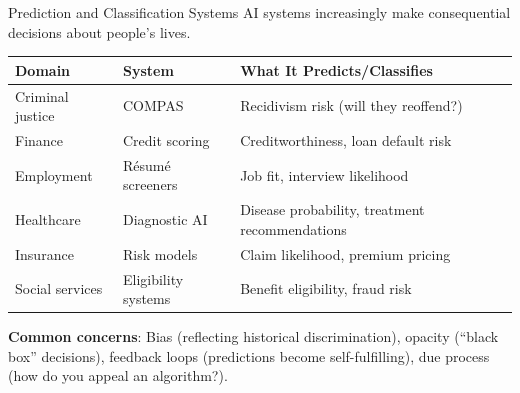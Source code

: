 ﻿\documentclass[aspectratio=169,11pt]{beamer}
\begin{document}
\begin{frame}{Prediction and Classification Systems}
AI systems increasingly make consequential decisions about people's lives.

\vspace{0.2em}
\begin{table}[h]
\centering
\scriptsize
\begin{tabular}{@{}p{2.3cm}p{3cm}p{6.5cm}@{}}
\toprule
\textbf{Domain} & \textbf{System} & \textbf{What It Predicts/Classifies} \\
\midrule
Criminal justice & COMPAS & Recidivism risk (will they reoffend?) \\
Finance & Credit scoring & Creditworthiness, loan default risk \\
Employment & Résumé screeners & Job fit, interview likelihood \\
Healthcare & Diagnostic AI & Disease probability, treatment recommendations \\
Insurance & Risk models & Claim likelihood, premium pricing \\
Social services & Eligibility systems & Benefit eligibility, fraud risk \\
\bottomrule
\end{tabular}
\end{table}

\vspace{0.2em}
\textbf{Common concerns}: Bias (reflecting historical discrimination), opacity (``black box'' decisions), feedback loops (predictions become self-fulfilling), due process (how do you appeal an algorithm?).
\end{frame}
\end{document}
